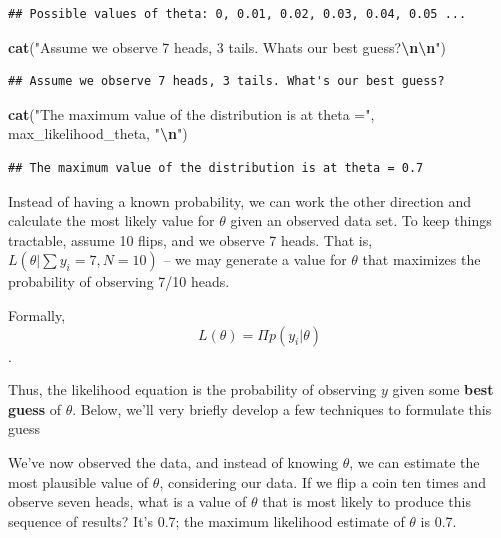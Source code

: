 \documentclass[
]{book}
\newenvironment{Shaded}{\begin{snugshade}}{\end{snugshade}}
\newcommand{\FunctionTok}[1]{\textcolor[rgb]{0.13,0.29,0.53}{\textbf{#1}}}
\newcommand{\NormalTok}[1]{#1}
\newcommand{\SpecialCharTok}[1]{\textcolor[rgb]{0.81,0.36,0.00}{\textbf{#1}}}
\newcommand{\StringTok}[1]{\textcolor[rgb]{0.31,0.60,0.02}{#1}}
\begin{document}
\begin{verbatim}
## Possible values of theta: 0, 0.01, 0.02, 0.03, 0.04, 0.05 ...
\end{verbatim}

\begin{Shaded}
\begin{Highlighting}[]
\FunctionTok{cat}\NormalTok{(}\StringTok{"Assume we observe 7 heads, 3 tails. What\textquotesingle{}s our best guess?}\SpecialCharTok{\textbackslash{}n\textbackslash{}n}\StringTok{"}\NormalTok{)}
\end{Highlighting}
\end{Shaded}

\begin{verbatim}
## Assume we observe 7 heads, 3 tails. What's our best guess?
\end{verbatim}

\begin{Shaded}
\begin{Highlighting}[]
\FunctionTok{cat}\NormalTok{(}\StringTok{"The maximum value of the distribution is at theta ="}\NormalTok{, max\_likelihood\_theta, }\StringTok{"}\SpecialCharTok{\textbackslash{}n}\StringTok{"}\NormalTok{)}
\end{Highlighting}
\end{Shaded}

\begin{verbatim}
## The maximum value of the distribution is at theta = 0.7
\end{verbatim}

Instead of having a known probability, we can work the other direction and calculate the most likely value for \(\theta\) given an observed data set. To keep things tractable, assume 10 flips, and we observe 7 heads. That is, \(L(\theta | \sum y_i=7, N=10)\) -- we may generate a value for \(\theta\) that maximizes the probability of observing 7/10 heads.

Formally, \[L(\theta)=\Pi p(y_i | \theta)\].

Thus, the likelihood equation is the probability of observing \(y\) given some \textbf{best guess} of \(\theta\). Below, we'll very briefly develop a few techniques to formulate this guess

We've now observed the data, and instead of knowing \(\theta\), we can estimate the most plausible value of \(\theta\), considering our data. If we flip a coin ten times and observe seven heads, what is a value of \(\theta\) that is most likely to produce this sequence of results? It's 0.7; the maximum likelihood estimate of \(\theta\) is 0.7.
\end{document}

